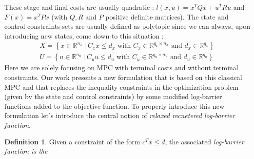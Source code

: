 \documentclass[12pt]{article}
\theoremstyle{definition}
\newtheorem{definition}[theorem]{Definition}
\theoremstyle{remark}
\def\cal#1{\mathcal{#1}}
\newcommand{\R}{\mathbb{R}}
\begin{document}
These stage and final costs are usually quadratic : $l(x,u)=x^TQx+u^TRu$ and $F(x)=x^TPx$ (with $Q,R$ and $P$ positive definite matrices).
The state and control constraints sets are usually defined as polytopic since we can always, upon introducing new states, come down to this situation :
\begin{align*}
	X=\left\{x\in\R^{n_x}~|~C_xx\leq d_x\text{ with }C_x\in\R^{q_x\times n_x}\text{ and }d_x\in\R^{q_x}\right\}\\
	U=\left\{u\in\R^{n_u}~|~C_uu\leq d_u\text{ with }C_u\in\R^{q_u\times n_u}\text{ and }d_u\in\R^{q_u}\right\}
\end{align*}
Here we are solely focusing on MPC with terminal costs and without terminal constraints.
\newline
Our work presents a new formulation that is based on this classical MPC and that replaces the inequality constraints in the optimization problem (given by the state and control constraints) by some modified log-barrier functions added to the objective function.
To properly introduce this new formulation let's introduce the  central notion of \textit{relaxed recnetered log-barrier function}.

\begin{definition}
	Given a constraint of the form $c^Tx\leq d$, the associated \textit{log-barrier function is the}
\end{definition}



\end{document}
